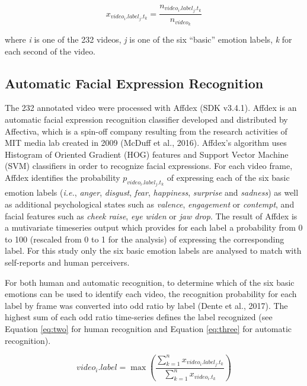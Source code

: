\documentclass[
  english,
  man]{apa7}
\begin{document}
\begin{equation}
x_{video_{i}.label_{j}.t_{k}} = \frac{n_{video_{i}.label_{j}.t_{k}}}{n_{video_{k}}}\label{eq:one}
\end{equation}

where \emph{i} is one of the 232 videos, \emph{j} is one of the six ``basic'' emotion labels, \emph{k} for each second of the video.

\hypertarget{automatic-facial-expression-recognition}{%
\subsection{Automatic Facial Expression Recognition}\label{automatic-facial-expression-recognition}}

The 232 annotated video were processed with Affdex (SDK v3.4.1). Affdex is an automatic facial expression recognition classifier developed and distributed by Affectiva, which is a spin-off company resulting from the research activities of MIT media lab created in 2009 (McDuff et al., 2016). Affdex's algorithm uses Histogram of Oriented Gradient (HOG) features and Support Vector Machine (SVM) classifiers in order to recognize facial expressions. For each video frame, Affdex identifies the probability \(p_{video_{i}.label_{j}.t_{k}}\) of expressing each of the six basic emotion labels (\emph{i.e.}, \emph{anger}, \emph{disgust}, \emph{fear}, \emph{happiness}, \emph{surprise} and \emph{sadness}) as well as additional psychological states such as \emph{valence}, \emph{engagement} or \emph{contempt}, and facial features such as \emph{cheek raise}, \emph{eye widen} or \emph{jaw drop}. The result of Affdex is a mutivariate timeseries output which provides for each label a probability from 0 to 100 (rescaled from 0 to 1 for the analysis) of expressing the corresponding label. For this study only the six basic emotion labels are analysed to match with self-reports and human perceivers.

For both human and automatic recognition, to determine which of the six basic emotions can be used to identify each video, the recognition probability for each label by frame was converted into odd ratio by label (Dente et al., 2017). The highest sum of each odd ratio time-series defines the label recognized (see Equation \eqref{eq:two} for human recognition and Equation \eqref{eq:three} for automatic recognition).

\begin{equation}
video_{i}.label = \max\left(\frac{\sum_{k=1}^{n}x_{video_{i}.label_{j}.t_{k}}}{\sum_{k=1}^{n}x_{video_{i}.t_{k}}}\right)\label{eq:two}
\end{equation}
\end{document}
